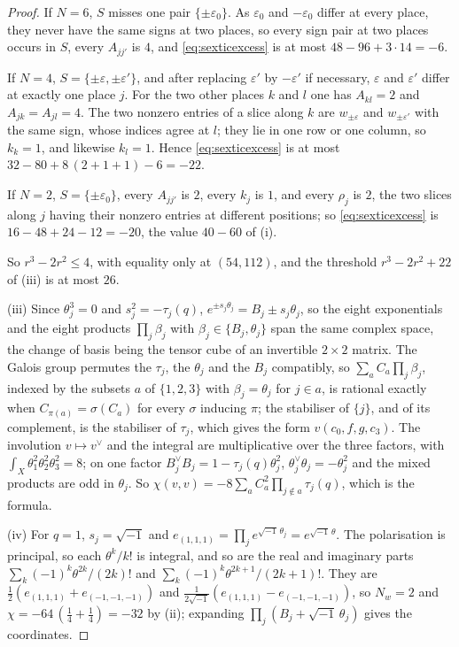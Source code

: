 \documentclass[11pt,reqno]{amsart}
\theoremstyle{plain}
\theoremstyle{definition}
\theoremstyle{remark}
\begin{document}
\begin{proof}
If $N=6$, $S$ misses one pair $\{\pm\varepsilon_{0}\}$. As $\varepsilon_{0}$
and $-\varepsilon_{0}$ differ at every place, they never have the same signs
at two places, so every sign pair at two places occurs in $S$, every
$A_{jj'}$ is $4$, and \eqref{eq:sexticexcess} is at most $48-96+3\cdot14=-6$.

If $N=4$, $S=\{\pm\varepsilon,\pm\varepsilon'\}$, and after replacing
$\varepsilon'$ by $-\varepsilon'$ if necessary, $\varepsilon$ and
$\varepsilon'$ differ at exactly one place $j$. For the two other places $k$
and $l$ one has $A_{kl}=2$ and $A_{jk}=A_{jl}=4$. The two nonzero entries of
a slice along $k$ are $w_{\pm\varepsilon}$ and $w_{\pm\varepsilon'}$ with the
same sign, whose indices agree at $l$; they lie in one row or one column, so
$k_{k}=1$, and likewise $k_{l}=1$. Hence \eqref{eq:sexticexcess} is at most
$32-80+8\,(2+1+1)-6=-22$.

If $N=2$, $S=\{\pm\varepsilon_{0}\}$, every $A_{jj'}$ is $2$, every $k_{j}$ is
$1$, and every $\rho_{j}$ is $2$, the two slices along $j$ having their
nonzero entries at different positions; so \eqref{eq:sexticexcess} is
$16-48+24-12=-20$, the value $40-60$ of (i).

So $r^{3}-2r^{2}\le4$, with equality only at $(54,112)$, and the threshold
$r^{3}-2r^{2}+22$ of (iii) is at most $26$.

(iii) Since $\theta_{j}^{3}=0$ and $s_{j}^{2}=-\tau_{j}(q)$,
$e^{\pm s_{j}\theta_{j}}=B_{j}\pm s_{j}\theta_{j}$, so the eight exponentials
and the eight products $\prod_{j}\beta_{j}$ with $\beta_{j}\in\{B_{j},\theta_{j}\}$
span the same complex space, the change of basis being the tensor cube of an
invertible $2\times2$ matrix. The Galois group permutes the $\tau_{j}$, the
$\theta_{j}$ and the $B_{j}$ compatibly, so $\sum_{a}C_{a}\prod_{j}\beta_{j}$,
indexed by the subsets $a$ of $\{1,2,3\}$ with $\beta_{j}=\theta_{j}$ for
$j\in a$, is rational exactly when $C_{\pi(a)}=\sigma(C_{a})$ for every
$\sigma$ inducing $\pi$; the stabiliser of $\{j\}$, and of its complement,
is the stabiliser of $\tau_{j}$, which gives the form $v(c_{0},f,g,c_{3})$.
The involution $v\mapsto v^{\vee}$ and the integral are multiplicative over
the three factors, with $\int_{X}\theta_{1}^{2}\theta_{2}^{2}\theta_{3}^{2}=8$;
on one factor $B_{j}^{\vee}B_{j}=1-\tau_{j}(q)\theta_{j}^{2}$,
$\theta_{j}^{\vee}\theta_{j}=-\theta_{j}^{2}$ and the mixed products are odd
in $\theta_{j}$. So
$\chi(v,v)=-8\sum_{a}C_{a}^{2}\prod_{j\notin a}\tau_{j}(q)$, which is the
formula.

(iv) For $q=1$, $s_{j}=\sqrt{-1}$ and $e_{(1,1,1)}=\prod_{j}e^{\sqrt{-1}\,
\theta_{j}}=e^{\sqrt{-1}\,\theta}$. The polarisation is principal, so each
$\theta^{k}/k!$ is integral, and so are the real and imaginary parts
$\sum_{k}(-1)^{k}\theta^{2k}/(2k)!$ and $\sum_{k}(-1)^{k}\theta^{2k+1}/(2k+1)!$.
They are $\tfrac12(e_{(1,1,1)}+e_{(-1,-1,-1)})$ and
$\tfrac1{2\sqrt{-1}}(e_{(1,1,1)}-e_{(-1,-1,-1)})$, so $N_{w}=2$ and
$\chi=-64\,(\tfrac14+\tfrac14)=-32$ by (ii); expanding
$\prod_{j}(B_{j}+\sqrt{-1}\,\theta_{j})$ gives the coordinates.
\end{proof}
\end{document}
